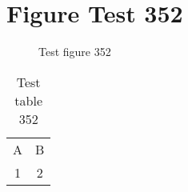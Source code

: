 \documentclass{article}
\begin{document}
\section{Figure Test 352}
\begin{figure}[h]
\caption{Test figure 352}
\end{figure}
\begin{table}[h]
\caption{Test table 352}
\begin{tabular}{cc}
A & B \\
1 & 2
\end{tabular}
\end{table}
\end{document}
